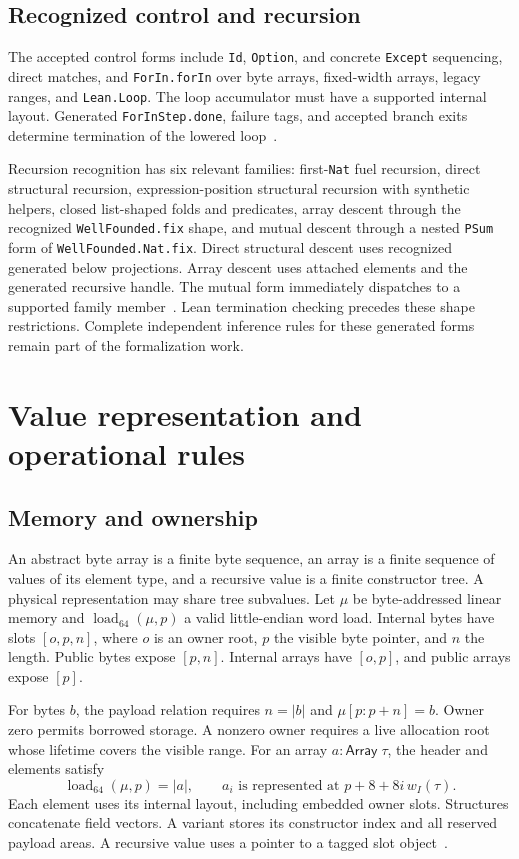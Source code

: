 \documentclass[11pt]{article}
\newcommand{\code}[1]{\texttt{#1}}
\newcommand{\ty}[1]{\mathsf{#1}}
\begin{document}
\subsection{Recognized control and recursion}

The accepted control forms include \code{Id}, \code{Option}, and concrete \code{Except} sequencing, direct matches, and \code{ForIn.forIn} over byte arrays, fixed-width arrays, legacy ranges, and \code{Lean.Loop}.  The loop accumulator must have a supported internal layout.  Generated \code{ForInStep.done}, failure tags, and accepted branch exits determine termination of the lowered loop~\cite{patterns,extract}.

Recursion recognition has six relevant families: first-\code{Nat} fuel recursion, direct structural recursion, expression-position structural recursion with synthetic helpers, closed list-shaped folds and predicates, array descent through the recognized \code{WellFounded.fix} shape, and mutual descent through a nested \code{PSum} form of \code{WellFounded.Nat.fix}.  Direct structural descent uses recognized generated below projections.  Array descent uses attached elements and the generated recursive handle.  The mutual form immediately dispatches to a supported family member~\cite{structural,extract}.  Lean termination checking precedes these shape restrictions.  Complete independent inference rules for these generated forms remain part of the formalization work.

\section{Value representation and operational rules}

\subsection{Memory and ownership}

An abstract byte array is a finite byte sequence, an array is a finite sequence of values of its element type, and a recursive value is a finite constructor tree.  A physical representation may share tree subvalues.  Let $\mu$ be byte-addressed linear memory and $\operatorname{load}_{64}(\mu,p)$ a valid little-endian word load.  Internal bytes have slots $[o,p,n]$, where $o$ is an owner root, $p$ the visible byte pointer, and $n$ the length.  Public bytes expose $[p,n]$.  Internal arrays have $[o,p]$, and public arrays expose $[p]$.

For bytes $b$, the payload relation requires $n=|b|$ and $\mu[p:p+n]=b$.  Owner zero permits borrowed storage.  A nonzero owner requires a live allocation root whose lifetime covers the visible range.  For an array $a:\ty{Array}\;\tau$, the header and elements satisfy
\[
\operatorname{load}_{64}(\mu,p)=|a|,
\qquad
a_i\text{ is represented at }p+8+8i\,w_I(\tau).
\]
Each element uses its internal layout, including embedded owner slots.  Structures concatenate field vectors.  A variant stores its constructor index and all reserved payload areas.  A recursive value uses a pointer to a tagged slot object~\cite{storage,values,binary}.
\end{document}
